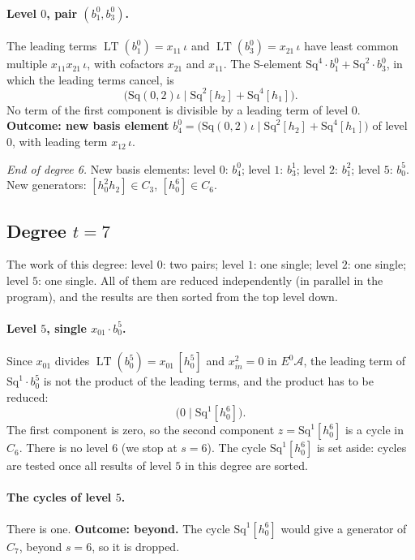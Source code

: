\documentclass[11pt]{article}
\newcommand{\Sq}{\mathrm{Sq}}
\newcommand{\A}{\mathcal{A}}
\DeclareMathOperator{\LT}{LT}
\begin{document}
\paragraph{Level $0$, pair $(b^{0}_{1}, b^{0}_{3})$.} The leading terms $\LT(b^{0}_{1}) = x_{11}\,\iota$ and $\LT(b^{0}_{3}) = x_{21}\,\iota$ have least common multiple $x_{11}x_{21}\,\iota$, with cofactors $x_{21}$ and $x_{11}$. The S-element $\Sq^{4}\cdot b^{0}_{1} + \Sq^{2}\cdot b^{0}_{3}$, in which the leading terms cancel, is
\[\bigl(\Sq(0,2)\iota \;\big|\; \Sq^{2}[h_2] + \Sq^{4}[h_1]\bigr).\]
No term of the first component is divisible by a leading term of level $0$.
\textbf{Outcome: new basis element} $b^{0}_{4} = \bigl(\Sq(0,2)\iota \;\big|\; \Sq^{2}[h_2] + \Sq^{4}[h_1]\bigr)$ of level $0$, with leading term $x_{12}\,\iota$.
\medskip
\par\noindent\emph{End of degree 6.} New basis elements: level $0$: $b^{0}_{4}$; level $1$: $b^{1}_{3}$; level $2$: $b^{2}_{1}$; level $5$: $b^{5}_{0}$. New generators: $[h_0^2h_2]\in C_{3}$, $[h_0^6]\in C_{6}$.
\subsection*{Degree $t = 7$}
\noindent The work of this degree: level $0$: two pairs; level $1$: one single; level $2$: one single; level $5$: one single. All of them are reduced independently (in parallel in the program), and the results are then sorted from the top level down.
\medskip
\paragraph{Level $5$, single $x_{01}\cdot b^{5}_{0}$.} Since $x_{01}$ divides $\LT(b^{5}_{0}) = x_{01}\,[h_0^5]$ and $x_{in}^2 = 0$ in $E^0\A$, the leading term of $\Sq^{1}\cdot b^{5}_{0}$ is not the product of the leading terms, and the product has to be reduced:
\[\bigl(0 \;\big|\; \Sq^{1}[h_0^6]\bigr).\]
The first component is zero, so the second component $z = \Sq^{1}[h_0^6]$ is a cycle in $C_{6}$.
There is no level $6$ (we stop at $s = 6$).
The cycle $\Sq^{1}[h_0^6]$ is set aside: cycles are tested once all results of level $5$ in this degree are sorted.
\medskip
\paragraph{The cycles of level $5$.} There is one.
\textbf{Outcome: beyond.} The cycle $\Sq^{1}[h_0^6]$ would give a generator of $C_{7}$, beyond $s = 6$, so it is dropped.
\medskip
\end{document}
